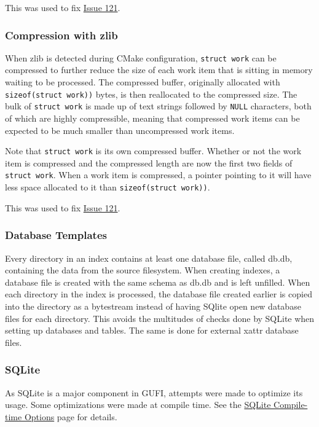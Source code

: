This was used to fix
\href{https://github.com/mar-file-system/GUFI/issues/121}{Issue 121}.

\subsubsection{Compression with zlib}
When zlib is detected during CMake configuration, \texttt{struct~work}
can be compressed to further reduce the size of each work item that is
sitting in memory waiting to be processed. The compressed buffer,
originally allocated with \texttt{sizeof(struct~work))} bytes, is then
reallocated to the compressed size. The bulk of \texttt{struct~work}
is made up of text strings followed by \texttt{NULL} characters, both
of which are highly compressible, meaning that compressed work items
can be expected to be much smaller than uncompressed work items.

Note that \texttt{struct~work} is its own compressed buffer. Whether
or not the work item is compressed and the compressed length are now
the first two fields of \texttt{struct~work}. When a work item is
compressed, a pointer pointing to it will have less space allocated to
it than \texttt{sizeof(struct~work))}.

This was used to fix
\href{https://github.com/mar-file-system/GUFI/issues/121}{Issue 121}.

\subsubsection{Database Templates}
Every directory in an index contains at least one database file,
called db.db, containing the \lstat data from the source
filesystem. When creating indexes, a database file is created with
the same schema as db.db and is left unfilled. When each directory in
the index is processed, the database file created earlier is copied
into the directory as a bytestream instead of having SQlite open new
database files for each directory. This avoids the multitudes of
checks done by SQLite when setting up databases and tables. The same
is done for external xattr database files.

\subsubsection{SQLite}
As SQLite is a major component in GUFI, attempts were made to optimize
its usage. Some optimizations were made at compile time. See the
\href{https://www.sqlite.org/compile.html}{SQLite Compile-time
  Options} page for details.


